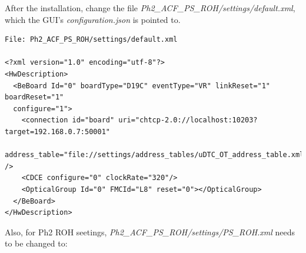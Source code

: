 \documentclass[10pt,a4paper]{article}
\begin{document}

After the installation, change the file \emph{Ph2\_ACF\_PS\_ROH/settings/default.xml}, which the GUI's \emph{configuration.json} is pointed to.

\begin{framed}
\begin{verbatim}
File: Ph2_ACF_PS_ROH/settings/default.xml

<?xml version="1.0" encoding="utf-8"?>
<HwDescription>
  <BeBoard Id="0" boardType="D19C" eventType="VR" linkReset="1" boardReset="1" 
  configure="1">
    <connection id="board" uri="chtcp-2.0://localhost:10203?target=192.168.0.7:50001"    
    address_table="file://settings/address_tables/uDTC_OT_address_table.xml" />
    <CDCE configure="0" clockRate="320"/>
    <OpticalGroup Id="0" FMCId="L8" reset="0"></OpticalGroup>
  </BeBoard>
</HwDescription>

\end{verbatim}
\end{framed}

\newpage

Also, for Ph2 ROH seetings, \emph{Ph2\_ACF\_PS\_ROH/settings/PS\_ROH.xml} needs to be changed to:
\end{document}
